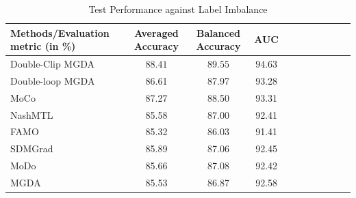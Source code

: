 \documentclass[twoside]{article} %
\theoremstyle{plain}
\theoremstyle{definition}
\theoremstyle{remark}
\begin{document}
\begin{table}[!t]
\centering
\caption{Test Performance against Label Imbalance}
\label{table:accuracy-celeba}
{
\scriptsize
\renewcommand{\arraystretch}{1.08}
\setlength{\tabcolsep}{1.5pt}


\begin{tabular*}{\textwidth}{
    @{\extracolsep{\fill}}
    lccccc|ccccc
    @{}
}
\toprule
Methods/Evaluation metric (in \%) & Averaged Accuracy & Balanced Accuracy & AUC \\
\midrule
Double-Clip MGDA & $\boldsymbol{88.41}$ & $\boldsymbol{89.55}$ & $\boldsymbol{94.63}$ \\
Double-loop MGDA & 86.61 & 87.97 & 93.28 \\
MoCo~\citep{MOCO} & 87.27 & 88.50 & 93.31 \\
NashMTL~\citep{nashMTL} & 85.58 & 87.00 & 92.41 \\
FAMO~\citep{FAMO} & 85.32 & 86.03 & 91.41 \\
SDMGrad~\citep{SDMkaiyiJi} & 85.89 & 87.06 & 92.45 \\
MoDo~\citep{MODO} & 85.66 & 87.08 & 92.42 \\
MGDA~\citep{MGDA1stwork,qimgda} & 85.53 & 86.87 & 92.58 \\
\bottomrule
\end{tabular*}%
}
\vspace{-1em}
\end{table}
\end{document}
